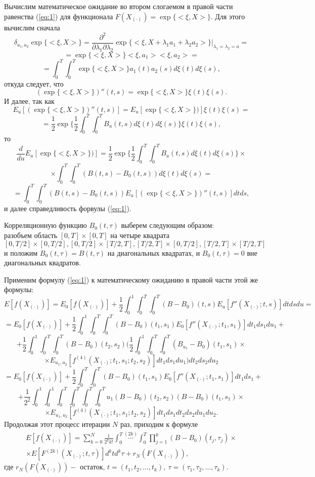 \documentclass [a4paper, 12pt]{report}
\begin{document}
Вычислим математическое ожидание во втором слогаемом в правой
части равенства (\ref{eq:1}) для функционала
$ F(X_{(\cdot)}) = \exp\{<\xi,X>\}.$
Для этого вычислим сначала
$$
\delta_{a_1,a_2}\exp\{<\xi,X>\} =
\frac{\partial^2}{\partial \lambda_1 \partial \lambda_2}
\exp\{<\xi,X + \lambda_1 a_1 + \lambda_2 a_2>\}
\big|_{\lambda_1=\lambda_2=a}=
$$
$$
= \exp\{<\xi,X>\}<\xi,a_1><\xi,a_2> =
$$
$$
=\int_{0}^{T}\int_{0}^{T}\exp\{<\xi,X>\}a_1(t)a_2(s)d\xi(t)d\xi(s),
$$
откуда следует, что
\begin{equation}\label{eq:6}
(\exp\{<\xi,X>\})''(t,s)=\exp\{<\xi,X>\}\xi(t)\xi(s).
\end{equation}
И далее, так как
$$
E_u[(\exp\{<\xi,X>\})''(t,s)] = E_u[\exp\{<\xi,X>\})]\xi(t)\xi(s)=
$$
$$
=\frac{1}{2}\exp\{\frac{1}{2}
\int_{0}^{T}\int_{0}^{T}B_u(t,s)d\xi(t)d\xi(s)\}\xi(t)\xi(s),
$$
то
$$
\frac{d}{du}E_u[\exp\{<\xi,X>\})]=
\frac{1}{2}\exp\{\frac{1}{2}
\int_{0}^{T}\int_{0}^{T}B_u(t,s)d\xi(t)d\xi(s)\}\times
$$
$$
\times\int_{0}^{T}\int_{0}^{T}(B(t,s)-B_0(t,s))d\xi(t)d\xi(s) =
$$
$$
=\int_{0}^{T}\int_{0}^{T}(B(t,s)-B_0(t,s))
E_u[(\exp\{<\xi,X>\})''(t,s)] dtds,
$$
и далее справедливость форвулы (\ref{eq:1}).


Корреляционную функцию $B_0(t,\tau)$ выберем следующим образом: \\
разобъем область $[0,T]\times[0,T]$ на четыре квадрата
$$
[0,T/2] \times [0, T/2],[0,T/2] \times [T/2, T],[T/2,T] \times [0, T/2],[T/2,T] \times [T/2, T]
$$
и положим $B_0(t,\tau) = B(t,\tau)$ на диагональных квадратах, и $B_0(t,\tau)=0$ вне диагональных квадратов.

Применим формулу (\ref{eq:1}) к математическому ожиданию в правой части этой же формулы:
$$
E[f(X_{(\cdot)})] = E_0[f(X_{(\cdot)})] + \frac{1}{2}\int_0^1\int_0^T\int_0^T{(B-B_0)(t,s)}E_u[f''(X_{(\cdot)};t,s)]dtdsdu =
$$
$$
= E_0[f(X_{(\cdot)})] + \frac{1}{2}\int_0^1\int_0^T\int_0^T{(B-B_0)(t_1,s_1)} E_0[f''(X_{(\cdot)};t_1,s_1)]dt_1ds_1du_1 +
$$
$$
+ \frac{1}{2}\int_0^1\int_0^T\int_0^T{(B-B_0)(t_2,s_2)}\big(
  \frac{1}{2}\int_0^1\int_0^T\int_0^T{(B_{u_1}-B_0)(t_1,s_1)} \times
$$
$$
\times E_{u_1,u_2}[f^{(4)}(X_{(\cdot)};t_1,s_1;t_2,s_2)]dt_1ds_1du_1 \big)
dt_2ds_2du_2
$$
$$
= E_0[f(X_{(\cdot)})] + \frac{1}{2}\int_0^T\int_0^T{(B-B_0)(t_1,s_1)} E_0[f''(X_{(\cdot)};t_1,s_1)]dt_1ds_1 +
$$
$$
+ \frac{1}{2^2}\int_0^1\int_{0}^{1}\int_0^T\int_0^T\int_0^T\int_0^T{u_1(B-B_0)(t_2,s_2)(B-B_0)(t_1,s_1)} \times
$$
$$
\times E_{u_1,u_2}[f^{(4)}(X_{(\cdot)};t_1,s_1;t_2,s_2)]dt_1ds_1
dt_2ds_2du_1du_2.
$$
Продолжая этот процесс итерации $N$ раз, приходим к формуле
\begin{equation}
  \begin{gathered}
E[f(X_{(\cdot)})] = \sum_{k=0}^{N}\frac{1}{2^{k}k!}
\int_{0}^{T}\stackrel{(2k)}{\cdots}\int_{0}^{T}
\prod_{j=1}^{k}(B-B_0)(t_j, \tau_j)\times \\
\times E[F^{(2k)}(X_{(\cdot)};t,\tau)]d^ktd^k\tau + r_N(F(X_{(\cdot)})),
\end{gathered}\label{eq:3}
\end{equation}
где $r_N(F(X_{(\cdot)})) -$ остаток, $t=(t_1,t_2,...,t_k),~ \tau=(\tau_1, \tau_2,...,\tau_k).$
\end{document}

